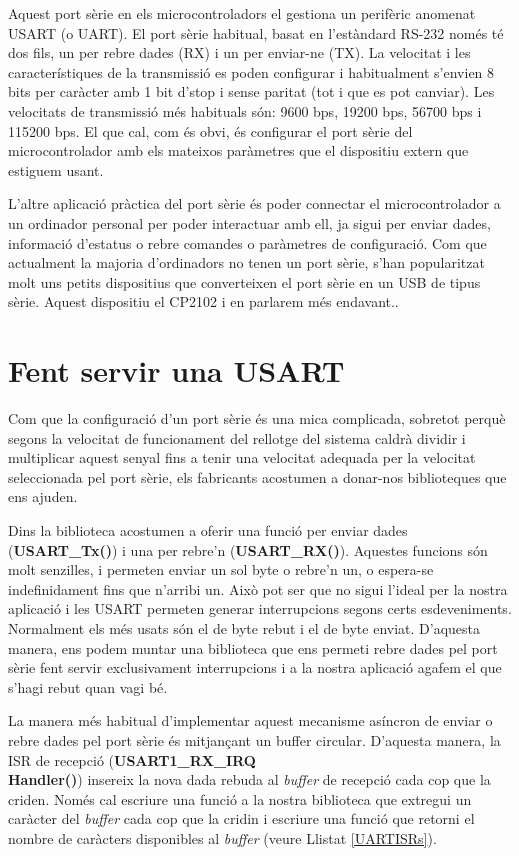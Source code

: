 Aquest port sèrie en els microcontroladors el gestiona un perifèric anomenat \gls{USART} (o \gls{UART}). El port sèrie habitual, basat en l'estàndard RS-232 només té dos fils, un per rebre dades (RX) i un per enviar-ne (TX). La velocitat i les característiques de la transmissió es poden configurar i habitualment s'envien 8 bits per caràcter amb 1 bit d'stop i sense paritat (tot i que es pot canviar). Les velocitats de transmissió més habituals són: 9600 \gls{bps}, 19200 bps, 56700 bps i 115200 bps. El que cal, com és obvi, és configurar el port sèrie del microcontrolador amb els mateixos paràmetres que el dispositiu extern que estiguem usant.

L'altre aplicació pràctica del port sèrie és poder connectar el microcontrolador a un ordinador personal per poder interactuar amb ell, ja sigui per enviar dades, informació d'estatus o rebre comandes o paràmetres de configuració. Com que actualment la majoria d'ordinadors no tenen un port sèrie, s'han popularitzat molt uns petits dispositius que converteixen el port sèrie en un \gls{USB} de tipus sèrie. Aquest dispositiu el \gls{CP2102} i en parlarem més endavant..

\section{Fent servir una USART}
Com que la configuració d'un port sèrie és una mica complicada, sobretot perquè segons la velocitat de funcionament del rellotge del sistema caldrà dividir i multiplicar aquest senyal fins a tenir una velocitat adequada per la velocitat seleccionada pel port sèrie, els fabricants acostumen a donar-nos biblioteques que ens ajuden.

Dins la biblioteca acostumen a oferir una funció per enviar dades ({\bf USART\_Tx()}) i una per rebre'n ({\bf USART\_RX()}). Aquestes funcions són molt senzilles, i permeten enviar un sol byte o rebre'n un, o espera-se indefinidament fins que n'arribi un. Això pot ser que no sigui l'ideal per la nostra aplicació i les \gls{USART} permeten generar interrupcions segons certs esdeveniments. Normalment els més usats són el de byte rebut i el de byte enviat. D'aquesta manera, ens podem muntar una biblioteca que ens permeti rebre dades pel port sèrie fent servir exclusivament interrupcions i a la nostra aplicació agafem el que s'hagi rebut quan vagi bé.

La manera més habitual d'implementar aquest mecanisme asíncron de enviar o rebre dades pel port sèrie és mitjançant un \gls{buffer circular}. D'aquesta manera, la \gls{ISR} de recepció ({\bf USART1\_RX\_IRQ\\Handler()}) insereix la nova dada rebuda al {\em buffer} de recepció cada cop que la criden. Només cal escriure una funció a la nostra biblioteca que extregui un caràcter del {\em buffer} cada cop que la cridin i escriure una funció que retorni el nombre de caràcters disponibles al {\em buffer} (veure Llistat \ref{UARTISRs}).

